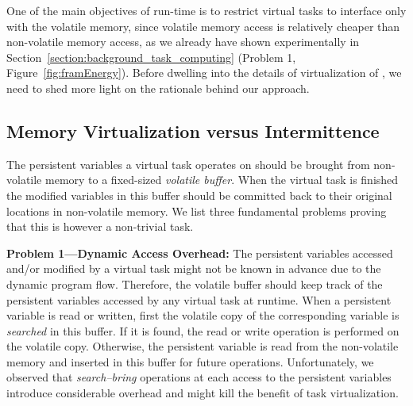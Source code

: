One of the main objectives of \sys run-time is to restrict virtual tasks to interface only with the volatile memory, since volatile memory access is relatively cheaper than non-volatile memory access, as we already have shown experimentally in Section~\ref{section:background_task_computing} (Problem 1, Figure~\ref{fig:framEnergy}). Before dwelling into the details of virtualization of \sys, we need to shed more light on the rationale behind our approach.

\subsection{Memory Virtualization versus Intermittence}
\label{sec:virtualization_problems}

The persistent variables a virtual task operates on should be brought from non-volatile memory to a fixed-sized \emph{volatile buffer}. When the virtual task is finished the modified variables in this buffer should be committed back to their original locations in non-volatile memory. We list three fundamental problems proving that this is however a non-trivial task. 



\textbf{Problem 1---Dynamic Access Overhead:} The persistent variables accessed and/or modified by a virtual task might not be known in advance due to the dynamic program flow. Therefore, the volatile buffer should keep track of the persistent variables accessed by any virtual task at runtime. When a persistent variable is read or written, first the volatile copy of the corresponding variable is \emph{searched} in this buffer. If it is found, the read or write operation is performed on the volatile copy. Otherwise, the persistent variable is read from the non-volatile memory and inserted in this buffer for future operations. Unfortunately, we observed that \emph{search--bring} operations at each access to the persistent variables introduce considerable overhead and might kill the benefit of task virtualization. %

